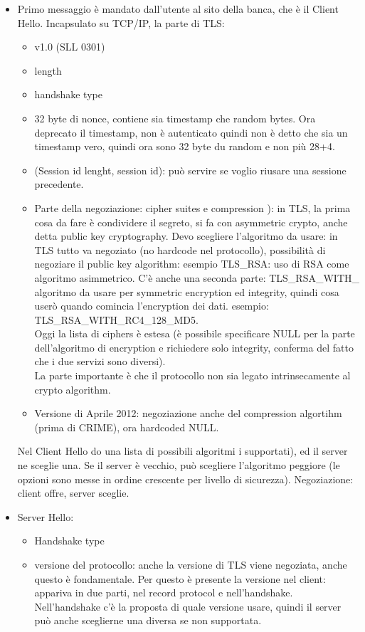 \documentclass[16px]{article}
\begin{document}
\begin{itemize}
\item Primo messaggio è mandato dall'utente al sito della banca, che è il Client Hello. Incapsulato su TCP/IP, la parte di TLS: 
\begin{itemize}
\item v1.0 (SLL 0301)
\item length
\item handshake type
\item 32 byte di nonce, contiene sia timestamp che random bytes. Ora deprecato il timestamp, non è autenticato quindi non è detto che sia un timestamp vero, quindi ora sono 32 byte du random e non più 28+4.
\item (Session id lenght, session id): può servire se voglio riusare una sessione precedente.
\item Parte della negoziazione: cipher suites e compression ): in TLS, la prima cosa da fare è condividere il segreto, si fa con asymmetric crypto, anche detta public key cryptography. Devo scegliere l'algoritmo da usare: in TLS tutto va negoziato (no hardcode nel protocollo), possibilità di negoziare il public key algorithm: esempio TLS\_RSA: uso di RSA come algoritmo asimmetrico. C'è anche una seconda parte: TLS\_RSA\_WITH\_ algoritmo da usare per symmetric encryption ed integrity, quindi cosa userò quando comincia l'encryption dei dati. esempio: TLS\_RSA\_WITH\_RC4\_128\_MD5.\\ Oggi la lista di ciphers è estesa (è possibile specificare NULL per la parte dell'algoritmo di encryption e richiedere solo integrity, conferma del fatto che i due servizi sono diversi).\\ La parte importante è che il protocollo non sia legato intrinsecamente al crypto algorithm.
\item Versione di Aprile 2012: negoziazione anche del compression algortihm (prima di CRIME), ora hardcoded NULL.
\end{itemize}
Nel Client Hello do una lista di possibili algoritmi i supportati), ed il server ne sceglie una. Se il server è vecchio, può scegliere l'algoritmo peggiore (le opzioni sono messe in ordine crescente per livello di sicurezza). Negoziazione: client offre, server sceglie.
\item Server Hello: 
\begin{itemize}
\item Handshake type
\item versione del protocollo: anche la versione di TLS viene negoziata, anche questo è fondamentale. Per questo è presente la versione nel client: appariva in due parti, nel record protocol e nell'handshake. Nell'handshake c'è la proposta di quale versione usare, quindi il server può anche sceglierne una diversa se non supportata.

\end{itemize}
\end{itemize}
\end{document}
